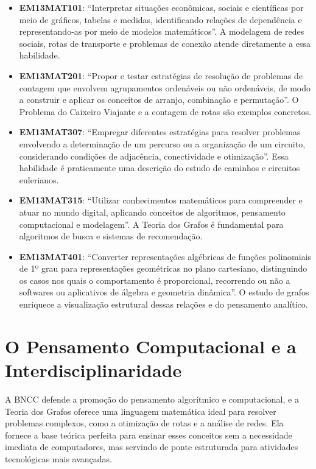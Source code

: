 \documentclass[
  12pt,
  oneside,
  a4paper,
  english,
  brazilian
  ]{abntex2}
\theoremstyle{definition}
\begin{document}
\begin{itemize}
  \item \textbf{EM13MAT101}: ``Interpretar situações econômicas, sociais e científicas por meio de gráficos, tabelas e medidas, identificando relações de dependência e representando-as por meio de modelos matemáticos''. A modelagem de redes sociais, rotas de transporte e problemas de conexão atende diretamente a essa habilidade.
  \item \textbf{EM13MAT201}: ``Propor e testar estratégias de resolução de problemas de contagem que envolvem agrupamentos ordenáveis ou não ordenáveis, de modo a construir e aplicar os conceitos de arranjo, combinação e permutação''. O Problema do Caixeiro Viajante e a contagem de rotas são exemplos concretos.
  \item \textbf{EM13MAT307}: ``Empregar diferentes estratégias para resolver problemas envolvendo a determinação de um percurso ou a organização de um circuito, considerando condições de adjacência, conectividade e otimização''. Essa habilidade é praticamente uma descrição do estudo de caminhos e circuitos eulerianos.
  \item \textbf{EM13MAT315}: ``Utilizar conhecimentos matemáticos para compreender e atuar no mundo digital, aplicando conceitos de algoritmos, pensamento computacional e modelagem''. A Teoria dos Grafos é fundamental para algoritmos de busca e sistemas de recomendação.
  \item \textbf{EM13MAT401}: ``Converter representações algébricas de funções polinomiais de 1º grau para representações geométricas no plano cartesiano, distinguindo os casos nos quais o comportamento é proporcional, recorrendo ou não a softwares ou aplicativos de álgebra e geometria dinâmica''. O estudo de grafos enriquece a visualização estrutural dessas relações e do pensamento analítico.
\end{itemize}

\section{O Pensamento Computacional e a Interdisciplinaridade}

A BNCC defende a promoção do pensamento algorítmico e computacional, e a Teoria dos Grafos oferece uma linguagem matemática ideal para resolver problemas complexos, como a otimização de rotas e a análise de redes. Ela fornece a base teórica perfeita para ensinar esses conceitos sem a necessidade imediata de computadores, mas servindo de ponte estruturada para atividades tecnológicas mais avançadas.
\end{document}
